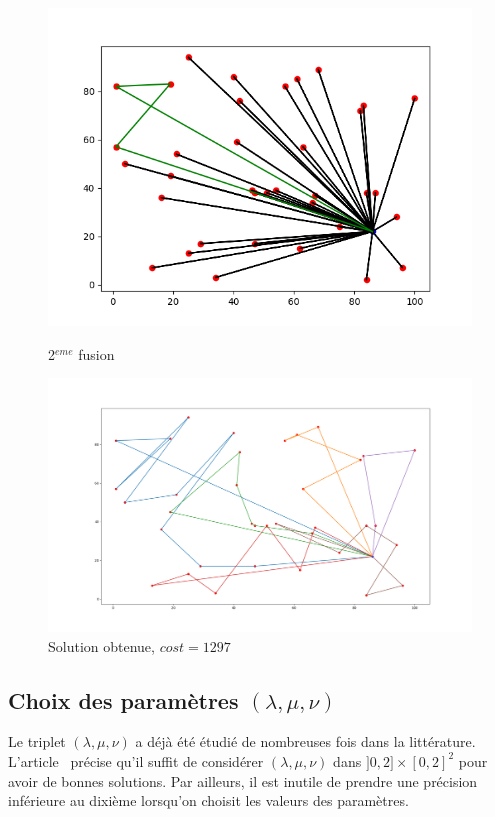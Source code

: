 \documentclass[a4paper,11pt]{article}%
\begin{document}
\begin{figure}
    \begin{minipage}[c]{.46\linewidth}
        \centering
	\includegraphics[scale=0.4]{CW2.png}
	\caption{2$^{eme}$ fusion}
	\label{CW2}
    \end{minipage}
    \hfill%
    \begin{minipage}[c]{.46\linewidth}
        \centering
	 \includegraphics[scale=0.17]{resCW101010.png}
	 \caption{Solution obtenue, $cost = 1297$}
	\label{resCW101010}
    \end{minipage}
\end{figure}
\subsection{Choix des paramètres $(\lambda, \mu, \nu)$}
Le triplet $(\lambda, \mu, \nu)$ a déjà été étudié de nombreuses fois dans la littérature. L'article~\cite{Altinel_2005} précise qu'il suffit de considérer $(\lambda, \mu, \nu)$ dans $]0,2] \times [0,2]^2$ pour avoir de bonnes solutions. 
Par ailleurs, il est inutile de prendre une précision inférieure au dixième lorsqu'on choisit les valeurs des paramètres.
\end{document}
